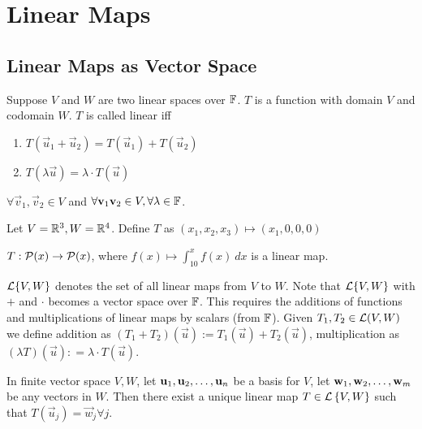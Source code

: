 \section{Linear Maps}
\begin{center}
\end{center}
\subsection{Linear Maps as Vector Space}
Suppose $V$ and $W$ are two linear spaces over $\mathbb F$. $T$ is a function with domain $V$ and codomain $W$. $T$ is called linear iff 
\begin{enumerate}
    \item $T(\vec u_1 + \vec u_2) = T(\vec u_1) + T(\vec u_2)$
    \item $T(\lambda \vec u) = \lambda \cdot T(\vec u)$
\end{enumerate}
$\forall \vec{v}_1, \vec{v}_2 \in V$ and $\forall \mathbf v_1 \mathbf v_2 \in V, \forall \lambda\in \mathbb F$.
\begin{example}
    Let $V = \mathbb R^3, W = \mathbb R^4$. Define $T$ as $(x_1, x_2, x_3) \mapsto (x_1,0,0,0)$
\end{example}
\begin{example}
    $T: \mathcal P(x) \to \mathcal P(x)$, where $\displaystyle f(x) \mapsto \int_{10}^x f(x) \ dx$ is a linear map.
\end{example}
\begin{definition}
    $\mathcal L\{V, W\}$ denotes the set of all linear maps from $V$ to $W$. Note that $\mathcal L\{V, W\}$ with $+$ and $\cdot$ becomes a vector space over $\mathbb F$. This requires the additions of functions and multiplications of linear maps by scalars (from $\mathbb F$). Given $T_1, T_2 \in \mathcal L(V,W)$ we define addition as $(T_1 + T_2)(\vec u) := T_1(\vec u) + T_2(\vec u)$, multiplication as $(\lambda T)(\vec u) : = \lambda \cdot T(\vec u)$. 
\end{definition}
\begin{theorem}
    In finite vector space $V,W$, let ${\mathbf u}_1,{\mathbf u}_2, \ldots, {\mathbf u}_{n}$ be a basis for $V$, let ${\mathbf w}_1,{\mathbf w}_2, \ldots, {\mathbf w}_{m}$ be any vectors in $W$. Then there exist a unique linear map $T \in \mathcal L \left\{ V, W \right\}$ such that $T(\vec u_j) = \vec w_j \forall j$.
\end{theorem}
